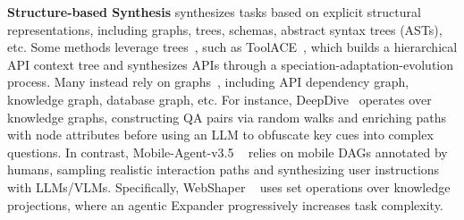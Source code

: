 



\textbf{Structure-based Synthesis} synthesizes tasks based on explicit structural representations, including graphs, trees, schemas, abstract syntax trees (ASTs), etc. Some methods leverage trees~\cite{ToolACE,WebLeaper}, such as ToolACE~\cite{ToolACE}, which builds a hierarchical API context tree and synthesizes APIs through a speciation-adaptation-evolution process. Many instead rely on graphs~\cite{WebSailor,DeepDive,AgentScaler,Tongyi_DeepResearch,CRMWeaver,ToolACE-MCP,MagicAgent,OpenSeeker}, including API dependency graph, knowledge graph, database graph, etc. For instance, DeepDive~\cite{DeepDive} operates over knowledge graphs, constructing QA pairs via random walks and enriching paths with node attributes before using an LLM to obfuscate key cues into complex questions. In contrast, Mobile-Agent-v3.5 ~\cite{Mobile-Agent-v3.5} relies on mobile DAGs annotated by humans, sampling realistic interaction paths and synthesizing user instructions with LLMs/VLMs. Specifically, WebShaper ~\cite{WebShaper} uses set operations over knowledge projections, where an agentic Expander progressively increases task complexity.

